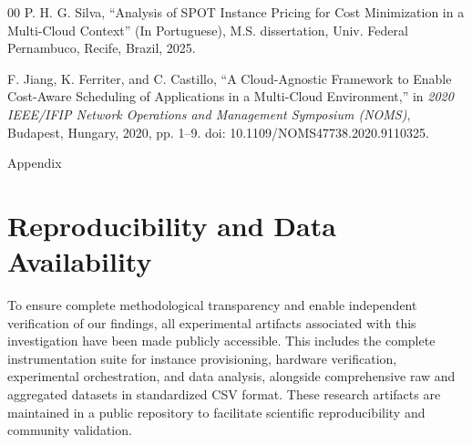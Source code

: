 \documentclass[conference]{IEEEtran}
\begin{document}
\begin{thebibliography}{00}
		 P. H. G. Silva, ``Analysis of SPOT Instance Pricing for Cost Minimization in a Multi-Cloud Context'' (In Portuguese), M.S. dissertation, Univ. Federal Pernambuco, Recife, Brazil, 2025.
		
		 F. Jiang, K. Ferriter, and C. Castillo, ``A Cloud-Agnostic Framework to Enable Cost-Aware Scheduling of Applications in a Multi-Cloud Environment,'' in \emph{2020 IEEE/IFIP Network Operations and Management Symposium (NOMS)}, Budapest, Hungary, 2020, pp. 1--9. doi: 10.1109/NOMS47738.2020.9110325.
		
	\end{thebibliography}
	
	\clearpage
	Appendix
	\section{Reproducibility and Data Availability}
	
	To ensure complete methodological transparency and enable independent verification of our findings, all experimental artifacts associated with this investigation have been made publicly accessible. This includes the complete instrumentation suite for instance provisioning, hardware verification, experimental orchestration, and data analysis, alongside comprehensive raw and aggregated datasets in standardized CSV format. These research artifacts are maintained in a public repository to facilitate scientific reproducibility and community validation.
	
	
\end{document}
